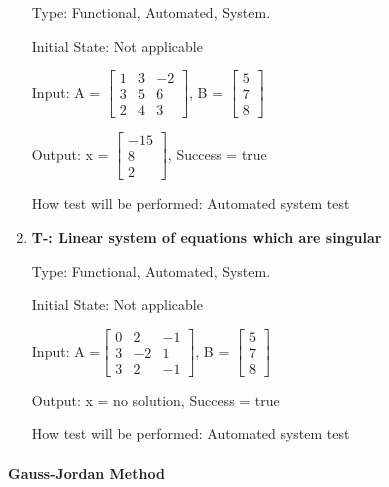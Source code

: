 \documentclass[12pt, titlepage]{article}
\newcounter{tnum}
\begin{document}
\begin{enumerate}
Type: Functional, Automated, System.
					
Initial State: Not applicable
					
Input: A =  $\begin{bmatrix} 
1 & 3 & -2 \\
3 & 5 & 6\\
2 & 4 & 3
\end{bmatrix}$, B = $\begin{bmatrix} 
5\\
7\\
8 
\end{bmatrix}$
					
Output: x = $\begin{bmatrix} 
-15\\
8\\
2 
\end{bmatrix}$, Success = true
					
How test will be performed: Automated system test

\item{\textbf{T-\thetnum \label{t-gaussian elimination_three}: Linear system of equations which are singular}}

Type: Functional, Automated, System.
					
Initial State: Not applicable
					
Input: A =$\begin{bmatrix} 
0 & 2 & -1 \\
3 & -2 & 1\\
3 & 2 & -1
\end{bmatrix}$, B = $\begin{bmatrix} 
5\\
7\\
8 
\end{bmatrix}$
					
Output: x = no solution, Success = true
					
How test will be performed: Automated system test

\end{enumerate}



\paragraph{Gauss-Jordan Method }
\end{document}
